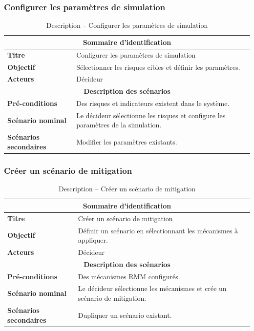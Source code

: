 \subsubsection{Configurer les paramètres de simulation}
\begin{table}[H]
\centering
\renewcommand{\arraystretch}{1.3}
\begin{tabular}{@{}p{}p{}@{}}
\hline
\multicolumn{2}{c}{\textbf{Sommaire d'identification}} \\
\hline
\textbf{Titre} & Configurer les paramètres de simulation \\
\textbf{Objectif} & Sélectionner les risques cibles et définir les paramètres. \\
\textbf{Acteurs} & Décideur \\
\hline
\multicolumn{2}{c}{\textbf{Description des scénarios}} \\
\hline
\textbf{Pré-conditions} & Des risques et indicateurs existent dans le système. \\
\textbf{Scénario nominal} & Le décideur sélectionne les risques et configure les paramètres de la simulation. \\
\textbf{Scénarios secondaires} & Modifier les paramètres existants. \\
\hline
\end{tabular}
\caption{Description -- Configurer les paramètres de simulation}
\end{table}

\subsubsection{Créer un scénario de mitigation}
\begin{table}[H]
\centering
\renewcommand{\arraystretch}{1.3}
\begin{tabular}{@{}p{}p{}@{}}
\hline
\multicolumn{2}{c}{\textbf{Sommaire d'identification}} \\
\hline
\textbf{Titre} & Créer un scénario de mitigation \\
\textbf{Objectif} & Définir un scénario en sélectionnant les mécanismes à appliquer. \\
\textbf{Acteurs} & Décideur \\
\hline
\multicolumn{2}{c}{\textbf{Description des scénarios}} \\
\hline
\textbf{Pré-conditions} & Des mécanismes RMM configurés. \\
\textbf{Scénario nominal} & Le décideur sélectionne les mécanismes et crée un scénario de mitigation. \\
\textbf{Scénarios secondaires} & Dupliquer un scénario existant. \\
\hline
\end{tabular}
\caption{Description -- Créer un scénario de mitigation}
\end{table}

